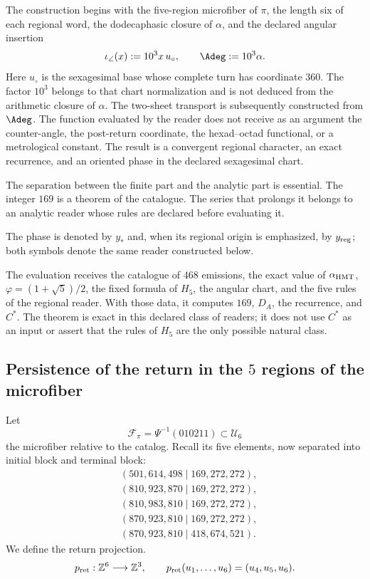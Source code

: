 The construction begins with the five-region microfiber of \(\pi\), the
length six of each regional word, the dodecaphasic closure of \(\alpha\),
and the declared angular insertion
\[
 \iota_\angle(x):=10^3x\,u_\circ,\qquad
 \Adeg:=10^3\alpha .
\]
Here \(u_\circ\) is the sexagesimal base whose complete turn has
coordinate \(360\).
The factor \(10^3\) belongs to that chart normalization and is not deduced from the
arithmetic closure of \(\alpha\). The two-sheet transport is subsequently constructed
from \(\Adeg\). The function evaluated by the reader does not receive as
an argument the counter-angle, the post-return coordinate, the
hexad--octad functional, or a metrological constant. The result is a
convergent regional character, an exact recurrence, and an oriented phase in the
declared sexagesimal chart.

The separation between the finite part and the analytic part is essential. The
integer \(169\) is a theorem of the catalogue. The series that prolongs it belongs
to an analytic reader whose rules are declared before evaluating it.

The phase is denoted by \(y_*\) and, when its regional origin is emphasized, by
\(y_{\rm reg}\); both symbols denote the same reader constructed
below.


The evaluation receives the catalogue of \(468\) emissions, the exact value of
\(\alpha_{\rm HMT}\), \(\varphi=(1+\sqrt5)/2\), the fixed formula of \(H_5\),
the angular chart, and the five rules of the regional reader. With those data, it
computes \(169\), \(D_A\), the recurrence, and \(C^*\). The theorem is exact in
this declared class of readers; it does not use \(C^*\) as an input or assert that
the rules of \(H_5\) are the only possible natural class.

\subsection{Persistence of the return in the \texorpdfstring{\(5\)}{5} regions of the microfiber}
\label{sec:s102:c38:2:2}


Let
\[
\mathcal F_\pi=\Psi^{-1}(010211)\subset\mathcal U_6
\]
the microfiber relative to the catalog. Recall its five elements, now
separated into initial block and terminal block:
\[
\begin{aligned}
 &(501,614,498\mid169,272,272),\\
 &(810,923,870\mid169,272,272),\\
 &(810,983,810\mid169,272,272),\\
 &(870,923,810\mid169,272,272),\\
 &(870,923,810\mid418,674,521).
\end{aligned}
\]
We define the return projection.
\[
p_{\rm ret}:\mathbb Z^6\longrightarrow\mathbb Z^3,
\qquad
p_{\rm ret}(u_1,\ldots,u_6)=(u_4,u_5,u_6).
\]

